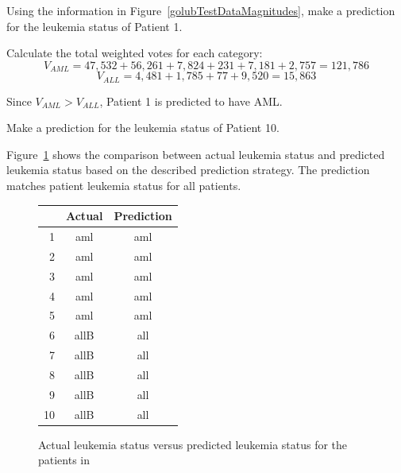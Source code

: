 \begin{examplewrap}
\begin{nexample}{Using the information in Figure~\ref{golubTestDataMagnitudes}, make a prediction for the leukemia status of Patient 1.}
	
Calculate the total weighted votes for each category:
\[V_{AML} = 47,532 + 56,261 + 7,824 + 231 + 7,181 + 2,757 = 121,786 \]
\[V_{ALL} = 4,481 + 1,785 + 77 + 9,520 = 15,863 \]	

Since $V_{AML} > V_{ALL}$, Patient 1 is predicted to have AML.
\end{nexample}
\end{examplewrap}

\begin{exercisewrap}
\begin{nexercise}
Make a prediction for the leukemia status of Patient 10.\footnotemark{}
\end{nexercise}
\end{exercisewrap}

Figure~\ref{golubActualPrediction} shows the comparison between actual leukemia status and predicted leukemia status based on the described prediction strategy. The prediction matches patient leukemia status for all patients. 

\begin{figure}[ht]
	\centering
	\begin{tabular}{r|cc}
		\hline
		& Actual & Prediction \\ 
		\hline
		1 & aml & aml \\ 
		2 & aml & aml \\ 
		3 & aml & aml \\ 
		4 & aml & aml \\ 
		5 & aml & aml \\ 
		6 & allB & all \\ 
		7 & allB & all \\ 
		8 & allB & all \\ 
		9 & allB & all \\ 
		10 & allB & all \\ 
		\hline
	\end{tabular}
	\caption{Actual leukemia status versus predicted leukemia status for the patients in  \label{golubActualPrediction}}
\end{figure}

